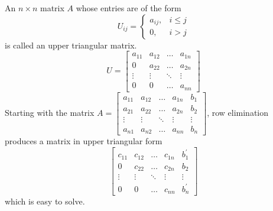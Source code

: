 \documentclass[../main.tex]{subfiles}
\begin{document}
\begin{definition}
	\label{defn:defn_2_3}An $n \times n$ matrix $A$ whose entries are of the form
$$
U_{i j}=\left\{\begin{aligned}
a_{i j}, & i \leq j \\
0, & i>j
\end{aligned}\right.
$$
is called an upper triangular matrix.
$$
U=\left[\begin{array}{cccc}
a_{11} & a_{12} & \ldots & a_{1 n} \\
0 & a_{22} & \ldots & a_{2 n} \\
\vdots & \vdots & \ddots & \vdots \\
0 & 0 & \ldots & a_{n n}
\end{array}\right]
$$
Starting with the matrix $A=\left[\begin{array}{cccc|c}a_{11} & a_{12} & \ldots & a_{1 n} & b_{1} \\ a_{21} & a_{22} & \ldots & a_{2 n} & b_{2} \\ \vdots & \vdots & \ddots & \vdots & \vdots \\ a_{n 1} & a_{n 2} & \ldots & a_{n n} & b_{n}\end{array}\right]$, row elimination produces a matrix in upper triangular form
$$
\left[\begin{array}{cccc|c}
c_{11} & c_{12} & \ldots & c_{1 n} & b_{1}^{\prime} \\
0 & c_{22} & \ldots & c_{2 n} & b_{2} \\
\vdots & \vdots & \ddots & \vdots & \vdots \\
0 & 0 & \ldots & c_{n n} & b_{n}^{\prime}
\end{array}\right]
$$
which is easy to solve.
\end{definition}
\end{document}
